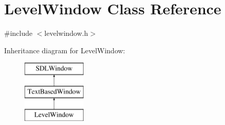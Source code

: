 \hypertarget{class_level_window}{}\section{Level\+Window Class Reference}
\label{class_level_window}


{\ttfamily \#include $<$levelwindow.\+h$>$}

Inheritance diagram for Level\+Window\+:\begin{figure}[H]
\begin{center}
\leavevmode
\includegraphics[height=3.000000cm]{class_level_window}
\end{center}
\end{figure}
